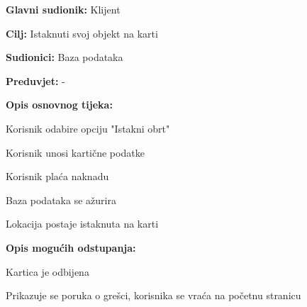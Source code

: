 					\noindent {}
					\begin{packed_item}
	
						\item \textbf{Glavni sudionik: }Klijent
						\item  \textbf{Cilj:} Istaknuti svoj objekt na karti
						\item  \textbf{Sudionici:} Baza podataka
						\item  \textbf{Preduvjet:} -
						\item  \textbf{Opis osnovnog tijeka:}
						
						\item[] \begin{packed_enum}
	
							\item Korisnik odabire opciju "Istakni obrt"
							\item Korisnik unosi kartične podatke
							\item Korisnik plaća naknadu
							\item Baza podataka se ažurira
							\item Lokacija postaje istaknuta na karti

						\end{packed_enum}
						
						\item  \textbf{Opis mogućih odstupanja:}
						
						\item[] \begin{packed_item}
	
							\item[3.a] Kartica je odbijena
							\item[] \begin{packed_enum}
								
								\item Prikazuje se poruka o grešci, korisnika se vraća na početnu stranicu
								
							\end{packed_enum}
							
						\end{packed_item}
						
					\end{packed_item}
					
